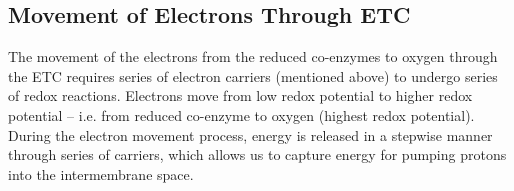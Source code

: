 \subsection{Movement of Electrons Through ETC}

The movement of the electrons from the reduced co-enzymes to oxygen through the ETC requires series of electron carriers (mentioned above) to undergo series of redox reactions.
Electrons move from low redox potential to higher redox potential -- i.e. from reduced co-enzyme to oxygen (highest redox potential).
During the electron movement process, energy is released in a stepwise manner through series of carriers, which allows us to capture energy for pumping protons into the intermembrane space.

\begin{center}
\end{center}

